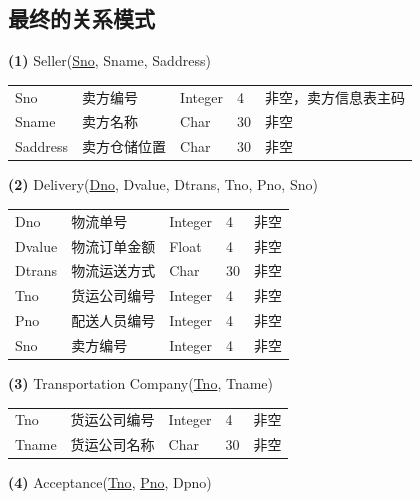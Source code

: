 \documentclass[12pt]{article}
\begin{document}
\subsection{最终的关系模式}

\noindent \textbf{(1)} Seller(\uline{Sno}, Sname, Saddress)

\begin{center}
	\begin{tabular}{lllll}
		\toprule
		Sno &	卖方编号 &	Integer &	4 &	非空，卖方信息表主码 \\
		Sname &	卖方名称 &	Char &	30 &	非空 \\
		Saddress &	卖方仓储位置 &	Char &	30 &	非空 \\
		\bottomrule
	\end{tabular}
\end{center}

\vspace{0.5cm}
\noindent \textbf{(2)} Delivery(\uline{Dno}, Dvalue, Dtrans, Tno, Pno, Sno)

\begin{center}
	\begin{tabular}{lllll}
		\toprule
		Dno &	物流单号 &	Integer &	4 &	非空 \\
		Dvalue &	物流订单金额 &	Float &	4 &	非空 \\
		Dtrans &	物流运送方式 &	Char &	30 &	非空 \\
		Tno &	货运公司编号 &	Integer &	4 &	非空 \\
		Pno &	配送人员编号 &	Integer &	4 &	非空 \\
		Sno &	卖方编号 &	Integer &	4 &	非空 \\
		\bottomrule
	\end{tabular}
\end{center}

\vspace{0.5cm}
\noindent \textbf{(3)} Transportation Company(\uline{Tno}, Tname)

\begin{center}
	\begin{tabular}{lllll}
		\toprule
		Tno &	货运公司编号 &	Integer &	4 &	非空 \\
		Tname &	货运公司名称 &	Char &	30 &	非空 \\
		\bottomrule
	\end{tabular}
\end{center}

\vspace{0.5cm}
\noindent \textbf{(4)} Acceptance(\uline{Tno}, \uline{Pno}, Dpno)
\end{document}
